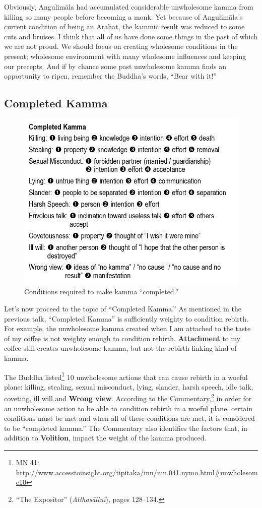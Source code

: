 Obviously, Angulimāla had accumulated considerable unwholesome kamma from killing so many people before becoming a monk. Yet because of Angulimāla’s current condition of being an Arahat, the kammic result was reduced to some cuts and bruises. I think that all of us have done some things in the past of which we are not proud. We should focus on creating wholesome conditions in the present; wholesome environment with many wholesome influences and keeping our precepts. And if by chance some past unwholesome kamma finds an opportunity to ripen, remember the Buddha’s words, “Bear with it!”

\subsection*{Completed Kamma}

\begin{figure}[h]
\centering
\includegraphics[width=0.7\linewidth]{./Diagrams/Completed}
\caption{Conditions required to make kamma “completed.”}
\label{fig:Completed}
\end{figure}

Let’s now proceed to the topic of “Completed Kamma.” As mentioned in the previous talk, “Completed Kamma” is sufficiently weighty to condition rebirth. For example, the unwholesome kamma created when I am attached to the taste of my coffee is not weighty enough to condition rebirth. \textbf{Attachment} to my coffee still creates unwholesome kamma, but not the rebirth-linking kind of kamma.

The Buddha listed\footnote{MN 41: \url{http://www.accesstoinsight.org/tipitaka/mn/mn.041.nymo.html\#unwholesome10}} 10 unwholesome actions that can cause rebirth in a woeful plane: killing, stealing, sexual misconduct, lying, slander, harsh speech, idle talk, coveting, ill will and \textbf{Wrong view}. According to the Commentary,\footnote{“The Expositor” (\textit{Atthasālinī}), pages 128--134.} in order for an unwholesome action to be able to condition rebirth in a woeful plane, certain conditions must be met and when all of these conditions are met, it is considered to be “completed kamma.” The Commentary also identifies the factors that, in addition to \textbf{Volition}, impact the weight of the kamma produced. 

